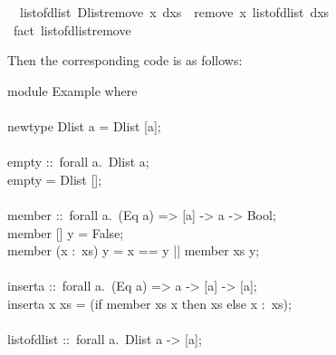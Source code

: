 \begin{isabellebody}
\ \ {\isachardoublequoteopen}list{\isacharunderscore}of{\isacharunderscore}dlist\ {\isacharparenleft}Dlist{\isachardot}remove\ x\ dxs{\isacharparenright}\ {\isacharequal}\ remove{}\ x\ {\isacharparenleft}list{\isacharunderscore}of{\isacharunderscore}dlist\ dxs{\isacharparenright}{\isachardoublequoteclose}\isanewline
\ \ \isamarkupfalse%
\ {\isacharparenleft}fact\ list{\isacharunderscore}of{\isacharunderscore}dlist{\isacharunderscore}remove{\isacharparenright}%
\endisatagquote
{\isafoldquote}%
%
\isadelimquote
%
\endisadelimquote
%
\begin{isamarkuptext}%
\noindent Then the corresponding code is as follows:%
\end{isamarkuptext}%
\isamarkuptrue%
%
\isadelimquote
%
\endisadelimquote
%
\isatagquote
%
\begin{isamarkuptext}%
\isatypewriter%
\noindent%
\hspace*{0pt}module Example where {}\\
\hspace*{0pt}\\
\hspace*{0pt}newtype Dlist a = Dlist [a];\\
\hspace*{0pt}\\
\hspace*{0pt}empty ::~forall a.~Dlist a;\\
\hspace*{0pt}empty = Dlist [];\\
\hspace*{0pt}\\
\hspace*{0pt}member ::~forall a.~(Eq a) => [a] -> a -> Bool;\\
\hspace*{0pt}member [] y = False;\\
\hspace*{0pt}member (x :~xs) y = x == y || member xs y;\\
\hspace*{0pt}\\
\hspace*{0pt}inserta ::~forall a.~(Eq a) => a -> [a] -> [a];\\
\hspace*{0pt}inserta x xs = (if member xs x then xs else x :~xs);\\
\hspace*{0pt}\\
\hspace*{0pt}list{}of{}dlist ::~forall a.~Dlist a -> [a];\\

\end{isamarkuptext}
\end{isabellebody}
